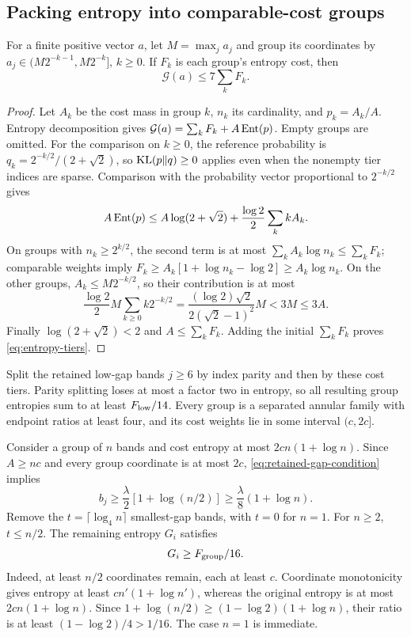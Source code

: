 \subsection{Packing entropy into comparable-cost groups}

\begin{lemma}\label{lem:entropy-tiers}
For a finite positive vector $a$, let $M=\max_j a_j$ and group its
coordinates by $a_j\in(M2^{-k-1},M2^{-k}]$, $k\ge0$.
If $F_k$ is each group's entropy cost, then
\begin{equation}\label{eq:entropy-tiers}
 \mathcal G(a)\le7\sum_k F_k.
\end{equation}
\end{lemma}

\begin{proof}
Let $A_k$ be the cost mass in group $k$, $n_k$ its cardinality, and
$p_k=A_k/A$. Entropy decomposition gives
$\mathcal G(a)=\sum_kF_k+A\operatorname{Ent}(p)$.
Empty groups are omitted. For the comparison on $k\ge0$, the reference
probability is $q_k=2^{-k/2}/(2+\sqrt2)$, so $\operatorname{KL}(p\Vert q)\ge0$
applies even when the nonempty tier indices are sparse.
Comparison with the probability vector proportional to $2^{-k/2}$ gives
\[
 A\operatorname{Ent}(p)\le A\log(2+\sqrt2)
                 +\frac{\log2}{2}\sum_k kA_k.
\]
On groups with $n_k\ge2^{k/2}$, the second term is at most
$\sum_kA_k\log n_k\le\sum_kF_k$; comparable weights imply
$F_k\ge A_k[1+\log n_k-\log2]\ge A_k\log n_k$.
On the other groups, $A_k\le M2^{-k/2}$, so their contribution is at most
\[
 \frac{\log2}{2}M\sum_{k\ge0}k2^{-k/2}
 =\frac{(\log2)\sqrt2}{2(\sqrt2-1)^2}M<3M\le3A.
 \]
Finally $\log(2+\sqrt2)<2$ and $A\le\sum_kF_k$.
Adding the initial $\sum_kF_k$ proves \eqref{eq:entropy-tiers}.
\end{proof}

Split the retained low-gap bands $j\ge6$ by index parity and then by
these cost tiers. Parity splitting loses at most a factor two in
entropy, so all resulting group entropies sum to at least $F_{\rm low}/14$.
Every group is a separated annular family with endpoint ratios at least
four, and its cost weights lie in some interval $(c,2c]$.

Consider a group of $n$ bands and cost entropy at most $2cn(1+\log n)$.
Since $A\ge nc$ and every group coordinate is at most $2c$,
\eqref{eq:retained-gap-condition} implies
\[
 b_j\ge\frac{\lambda}{2}[1+\log(n/2)]
       \ge\frac{\lambda}{8}(1+\log n).
\]
Remove the $t=\lceil\log_4n\rceil$ smallest-gap bands, with $t=0$ for
$n=1$. For $n\ge2$, $t\le n/2$. The remaining entropy $G_i$ satisfies
\begin{equation}\label{eq:trimmed-entropy}
 G_i\ge F_{\rm group}/16.
\end{equation}
Indeed, at least $n/2$ coordinates remain, each at least $c$.
Coordinate monotonicity gives entropy at least
$cn'(1+\log n')$, whereas the original entropy is at most
$2cn(1+\log n)$. Since
$1+\log(n/2)\ge(1-\log2)(1+\log n)$, their ratio is at least
$(1-\log2)/4>1/16$. The case $n=1$ is immediate.

